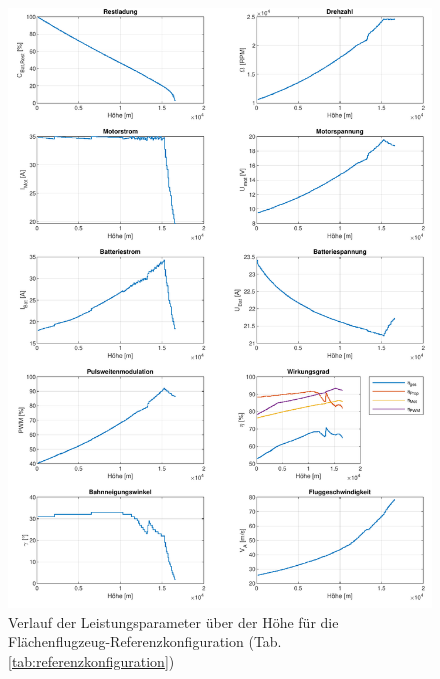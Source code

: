 \begin{figure}[H]
	\includegraphics[scale=0.7]{Diagramme/Ausgangskonstellation.pdf}
	\caption{Verlauf der Leistungsparameter über der Höhe für die Flächenflugzeug-Referenzkonfiguration (Tab. \ref{tab:referenzkonfiguration})}
	\label{abb:referenzkonfiguration}
\end{figure}
